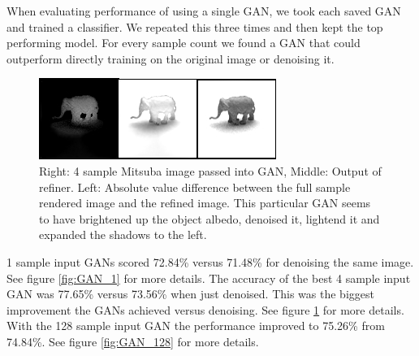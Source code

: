 \documentclass[10pt,twocolumn,letterpaper]{article}
\begin{document}
When evaluating performance of using a single GAN, we took each saved GAN and trained a classifier.  We repeated this three times and then kept the top performing model.   For every sample count we found a GAN that could outperform directly training on the original image or denoising it.


\begin{figure}[h!]
\centering
\includegraphics[width=1.0\columnwidth]{./assets/4sampleGAN-onerow.png}
\caption{Right: 4 sample Mitsuba image passed into GAN, Middle: Output of refiner.  Left: Absolute value difference between the full sample rendered image and the refined image. This particular GAN seems to have brightened up the object albedo, denoised it, lightend it and expanded the shadows to the left.}
\label{fig:GAN_4}
\end{figure}

1 sample input GANs scored 72.84\% versus 71.48\% for denoising the same image. See figure \ref{fig:GAN_1} for more details.  The accuracy of the best 4 sample input GAN was 77.65\% versus 73.56\% when just denoised. This was the biggest improvement the GANs achieved versus denoising. See figure \ref{fig:GAN_4} for more details.  With the 128 sample input GAN the performance improved to 75.26\% from 74.84\%. See figure \ref{fig:GAN_128} for more details.
\end{document}
